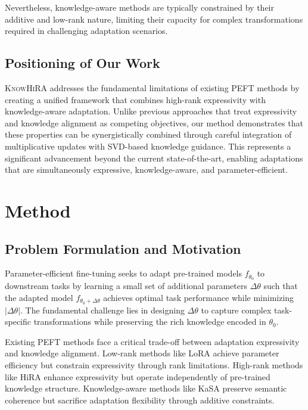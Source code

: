\documentclass[10pt,letterpaper]{article}
\begin{document}
Nevertheless, knowledge-aware methods are typically constrained by their additive and low-rank nature, limiting their capacity for complex transformations required in challenging adaptation scenarios.

\subsection{Positioning of Our Work}

\textsc{KnowHiRA} addresses the fundamental limitations of existing PEFT methods by creating a unified framework that combines high-rank expressivity with knowledge-aware adaptation. Unlike previous approaches that treat expressivity and knowledge alignment as competing objectives, our method demonstrates that these properties can be synergistically combined through careful integration of multiplicative updates with SVD-based knowledge guidance. This represents a significant advancement beyond the current state-of-the-art, enabling adaptations that are simultaneously expressive, knowledge-aware, and parameter-efficient.

\section{Method}

\subsection{Problem Formulation and Motivation}

Parameter-efficient fine-tuning seeks to adapt pre-trained models $f_{\theta_0}$ to downstream tasks by learning a small set of additional parameters $\Delta\theta$ such that the adapted model $f_{\theta_0 + \Delta\theta}$ achieves optimal task performance while minimizing $|\Delta\theta|$. The fundamental challenge lies in designing $\Delta\theta$ to capture complex task-specific transformations while preserving the rich knowledge encoded in $\theta_0$.

Existing PEFT methods face a critical trade-off between adaptation expressivity and knowledge alignment. Low-rank methods like LoRA achieve parameter efficiency but constrain expressivity through rank limitations. High-rank methods like HiRA enhance expressivity but operate independently of pre-trained knowledge structure. Knowledge-aware methods like KaSA preserve semantic coherence but sacrifice adaptation flexibility through additive constraints.
\end{document}
